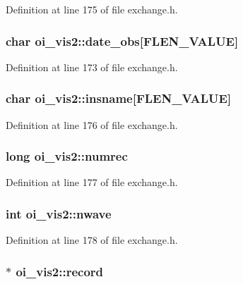 Definition at line 175 of file exchange.h.

\hypertarget{structoi__vis2_ad8a5862de3445b02015b25500da07f79}{
\subsubsection[{date\_\-obs}]{\setlength{\rightskip}{0pt plus 5cm}char {\bf oi\_\-vis2::date\_\-obs}\mbox{[}FLEN\_\-VALUE\mbox{]}}}
\label{structoi__vis2_ad8a5862de3445b02015b25500da07f79}


Definition at line 173 of file exchange.h.

\hypertarget{structoi__vis2_af4fc16aa8199ad4c95012012fcdd836c}{
\subsubsection[{insname}]{\setlength{\rightskip}{0pt plus 5cm}char {\bf oi\_\-vis2::insname}\mbox{[}FLEN\_\-VALUE\mbox{]}}}
\label{structoi__vis2_af4fc16aa8199ad4c95012012fcdd836c}


Definition at line 176 of file exchange.h.

\hypertarget{structoi__vis2_a4995c2d065c5ad1dddb5f59eebec14af}{
\subsubsection[{numrec}]{\setlength{\rightskip}{0pt plus 5cm}long {\bf oi\_\-vis2::numrec}}}
\label{structoi__vis2_a4995c2d065c5ad1dddb5f59eebec14af}


Definition at line 177 of file exchange.h.

\hypertarget{structoi__vis2_a3069b43b95ce6d4877902a0095213461}{
\subsubsection[{nwave}]{\setlength{\rightskip}{0pt plus 5cm}int {\bf oi\_\-vis2::nwave}}}
\label{structoi__vis2_a3069b43b95ce6d4877902a0095213461}


Definition at line 178 of file exchange.h.

\hypertarget{structoi__vis2_a81c8fc75ea58572ee3df3488f9ee2086}{
\subsubsection[{record}]{$\ast$ {\bf oi\_\-vis2::record}}}
\label{structoi__vis2_a81c8fc75ea58572ee3df3488f9ee2086}


